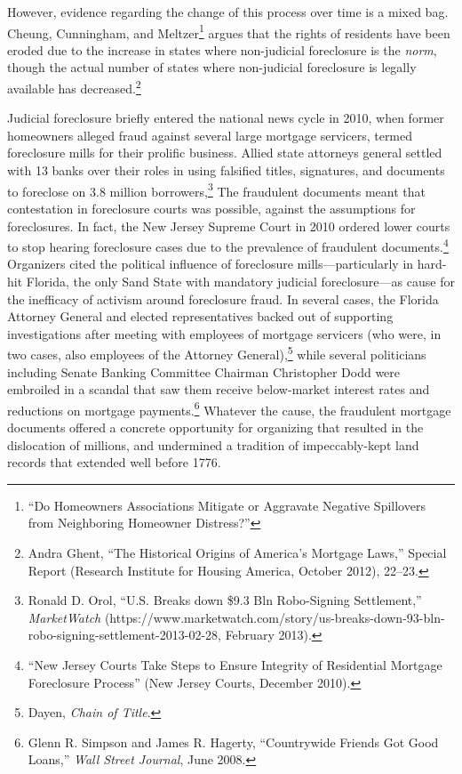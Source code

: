 \documentclass[12pt,oneside]{psthesis}
\begin{document}
However, evidence regarding the change of this process over time is a mixed bag.
Cheung, Cunningham, and Meltzer\footnote{``Do Homeowners Associations Mitigate or Aggravate Negative Spillovers from Neighboring Homeowner Distress?''} argues that the rights of residents have been eroded due to the increase in states where non-judicial foreclosure is the \emph{norm}, though the actual number of states where non-judicial foreclosure is legally available has decreased.\footnote{Andra Ghent, ``The Historical Origins of America's Mortgage Laws,'' Special Report (Research Institute for Housing America, October 2012), 22--23.}

Judicial foreclosure briefly entered the national news cycle in 2010, when former homeowners alleged fraud against several large mortgage servicers, termed foreclosure mills for their prolific business.
Allied state attorneys general settled with 13 banks over their roles in using falsified titles, signatures, and documents to foreclose on 3.8 million borrowers,\footnote{Ronald D. Orol, ``U.S. Breaks down \$9.3 Bln Robo-Signing Settlement,'' \emph{MarketWatch} (https://www.marketwatch.com/story/us-breaks-down-93-bln-robo-signing-settlement-2013-02-28, February 2013).}
The fraudulent documents meant that contestation in foreclosure courts was possible, against the assumptions for foreclosures.
In fact, the New Jersey Supreme Court in 2010 ordered lower courts to stop hearing foreclosure cases due to the prevalence of fraudulent documents.\footnote{``New Jersey Courts Take Steps to Ensure Integrity of Residential Mortgage Foreclosure Process'' (New Jersey Courts, December 2010).}
Organizers cited the political influence of foreclosure mills---particularly in hard-hit Florida, the only Sand State with mandatory judicial foreclosure---as cause for the inefficacy of activism around foreclosure fraud.
In several cases, the Florida Attorney General and elected representatives backed out of supporting investigations after meeting with employees of mortgage servicers (who were, in two cases, also employees of the Attorney General),\footnote{Dayen, \emph{Chain of Title}.} while several politicians including Senate Banking Committee Chairman Christopher Dodd were embroiled in a scandal that saw them receive below-market interest rates and reductions on mortgage payments.\footnote{Glenn R. Simpson and James R. Hagerty, ``Countrywide Friends Got Good Loans,'' \emph{Wall Street Journal}, June 2008.}
Whatever the cause, the fraudulent mortgage documents offered a concrete opportunity for organizing that resulted in the dislocation of millions, and undermined a tradition of impeccably-kept land records that extended well before 1776.
\end{document}
